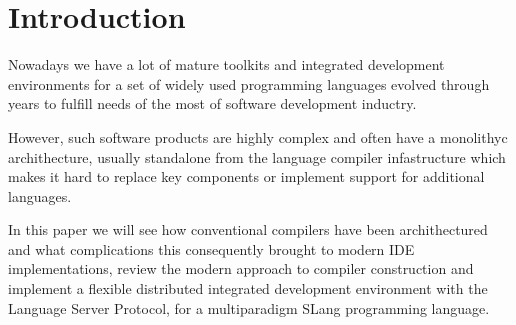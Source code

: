 \chapter{Introduction}
\label{chap:intro}

Nowadays we have a lot of mature toolkits and integrated development environments for a set of widely used programming languages
evolved through years to fulfill needs of the most of software development inductry.

However, such software products are highly complex and often have a monolithyc archithecture, usually standalone 
from the language compiler infastructure which makes it hard to replace key components or implement support for additional languages.

In this paper we will see how conventional compilers have been archithectured and what complications 
this consequently brought to modern IDE implementations, review the modern approach to compiler construction and implement a flexible 
distributed integrated development environment with the \\Language Server Protocol, for a multiparadigm SLang programming language. 